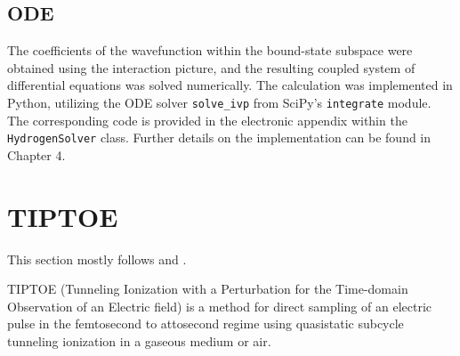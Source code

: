 



\subsection{ODE}
The coefficients of the wavefunction within the bound-state subspace were obtained using the interaction picture, and the resulting coupled system of differential equations was solved numerically.
The calculation was implemented in Python, utilizing the ODE solver \texttt{solve\_ivp} from SciPy’s \texttt{integrate} module.
The corresponding code is provided in the electronic appendix within the \texttt{HydrogenSolver} class.
Further details on the implementation can be found in Chapter 4.




\section{TIPTOE}
This section mostly follows \cite{Park:18} and \cite{manorammasterthesis}.

TIPTOE (Tunneling Ionization with a Perturbation for the Time-domain Observation of an Electric field) is a method for direct sampling of an electric pulse in the femtosecond to attosecond regime using quasistatic subcycle tunneling ionization in a gaseous medium or air.

